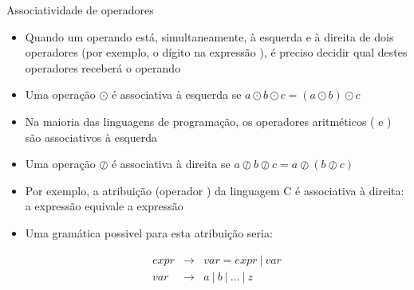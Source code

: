 \begin{frame}[fragile]{Associatividade de operadores}

    \begin{itemize}
        \item Quando um operando está, simultaneamente, à esquerda e à direita de dois operadores (por exemplo, o dígito  na expressão
            ), é preciso decidir qual destes operadores receberá o operando

        \item Uma operação $\odot$ é associativa à esquerda se $a\odot b\odot c = (a\odot b)\odot c$

        \item Na maioria das linguagens de programação, os operadores aritméticos ( e ) são associativos à esquerda

        \item Uma operação $\oslash$ é associativa à direita se $a\oslash b\oslash c = a\oslash (b\oslash c)$

        \item Por exemplo, a atribuição (operador ) da linguagem C é associativa à direita: a expressão  equivale a expressão

        \item Uma gramática possivel para esta atribuição seria:
        \begin{footnotesize}
        \[
            \begin{array}{rcl}
                expr & \to & var = expr\ |\ var \\
                var & \to & a\ |\ b\ |\ \ldots \ |\ z
            \end{array}
        \]
        \end{footnotesize}
    \end{itemize}

\end{frame}

